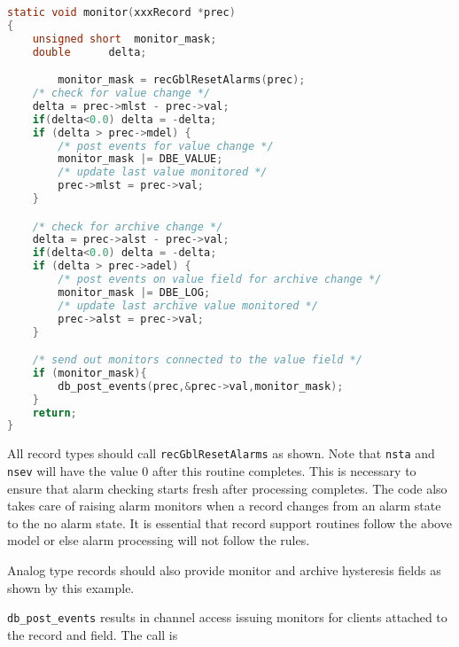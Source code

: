 \begin{lstlisting}[language=C]
static void monitor(xxxRecord *prec)
{
	unsigned short	monitor_mask;
	double		delta;

        monitor_mask = recGblResetAlarms(prec);
	/* check for value change */
	delta = prec->mlst - prec->val;
	if(delta<0.0) delta = -delta;
	if (delta > prec->mdel) {
		/* post events for value change */
		monitor_mask |= DBE_VALUE;
		/* update last value monitored */
		prec->mlst = prec->val;
	}

	/* check for archive change */
	delta = prec->alst - prec->val;
	if(delta<0.0) delta = -delta;
	if (delta > prec->adel) {
		/* post events on value field for archive change */
		monitor_mask |= DBE_LOG;
		/* update last archive value monitored */
		prec->alst = prec->val;
	}

	/* send out monitors connected to the value field */
	if (monitor_mask){
		db_post_events(prec,&prec->val,monitor_mask);
	}
	return;
}
\end{lstlisting}

All record types should call \verb|recGblResetAlarms| as shown.
Note that \verb|nsta| and \verb|nsev| will have the value 0 after this routine completes.
This is necessary to ensure that alarm checking starts fresh after processing completes.
The code also takes care of raising alarm monitors when a record changes from an alarm state to the no alarm state.
It is essential that record support routines follow the above model or else alarm processing will not follow the rules.

Analog type records should also provide monitor and archive hysteresis fields as shown by this example.

\verb|db_post_events| results in channel access issuing monitors for clients attached to the record and field.
The call is

